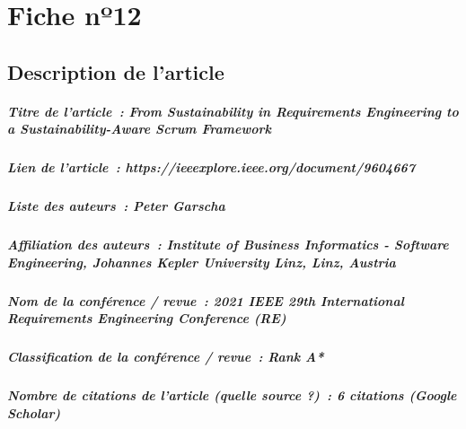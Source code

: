 
\chapter{Fiche nº12} %
\label{app:Fiche12} %

\section{Description de l'article}

\paragraph{Titre de l'article~: \textnormal{From Sustainability in Requirements Engineering to a Sustainability-Aware Scrum Framework}}
\paragraph{Lien de l'article~: \textnormal{https://ieeexplore.ieee.org/document/9604667}}
\paragraph{Liste des auteurs~: \textnormal{Peter Garscha}}
\paragraph{Affiliation des auteurs~: \textnormal{Institute of Business Informatics - Software Engineering, Johannes Kepler University Linz, Linz, Austria}}
\paragraph{Nom de la conférence / revue~: \textnormal{2021 IEEE 29th International Requirements Engineering Conference (RE)}}
\paragraph{Classification de la conférence / revue~: \textnormal{Rank A*}}
\paragraph{Nombre de citations de l'article (quelle source ?)~: \textnormal{6 citations (Google Scholar)}}



